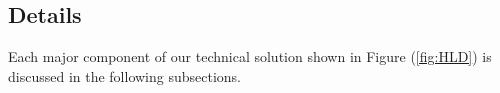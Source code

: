 \subsection{Details} \label{sec:TechSolDetails}
Each major component of our technical solution shown in Figure (\ref{fig:HLD}) is discussed in the following subsections. 







